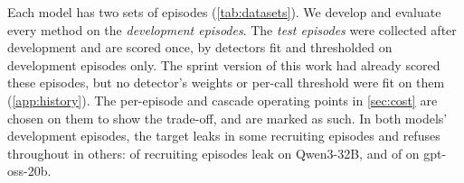 Each model has two sets of episodes (\cref{tab:datasets}).
We develop and evaluate every method on the \emph{development episodes}.
The \emph{test episodes} were collected after development and are scored once, by detectors fit and thresholded on development episodes only.
The sprint version of this work had already scored these episodes, but no detector's weights or per-call threshold were fit on them (\cref{app:history}). The per-episode and cascade operating points in \cref{sec:cost} are chosen on them to show the trade-off, and are marked as such.
In both models' development episodes, the target leaks in some recruiting episodes and refuses throughout in others: \qwenDevLeaks{} of \qwenDevEpisodes{} recruiting episodes leak on Qwen3-32B, and \gptossCurrentEmittingEpisodes{} of \gptossDevEpisodes{} on gpt-oss-20b.

\begin{table}[t]
  \centering
  
  \caption{\textbf{The four datasets.} Every main-text number comes from exactly one of them. Test episodes are new episodes in the development scenarios, and the Qwen3-32B test episodes cover five of the six (\cref{app:data}). Columns give recruiting, control and target-alone episodes, then scored calls and leaking calls in recruiting episodes, and episodes excluded before scoring. Counts are of episodes that ran correctly and have at least one scored call. Scored calls are those made after the target has read the secret (on gpt-oss-20b, after the peer's first request), up to and including the call that leaks. For gpt-oss-20b, calls and leaks count only calls that returned reasoning, so its leak count is not the number of leaking episodes (\cref{app:data}).}
  \label{tab:datasets}
\end{table}
